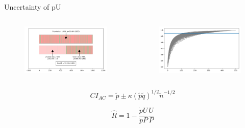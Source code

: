 \documentclass[9pt]{beamer}
\begin{document}
\begin{frame}{Uncertainty of pU}

\begin{columns}
	\begin{column}{0.5\linewidth}
		\begin{figure}
			\includegraphics[width=\linewidth]{../images/sample_status_2.png}
		\end{figure}
	\end{column}
	\begin{column}{0.5\linewidth}
		\begin{figure}
			\includegraphics[width=\linewidth]{../images/sample_recall_2.png}
		\end{figure}
	\end{column}

\end{columns}

\bigskip

	\[   CI_{AC} = \tilde{p} \pm \kappa(\tilde{p}\tilde{q})^{1/2}\tilde{n}^{-1/2}  \]
	
\[ \hat{R} = 1- \frac{\dot{p}U}{\dot{p}P} \frac{U}{P} \]

\end{frame}
\end{document}
